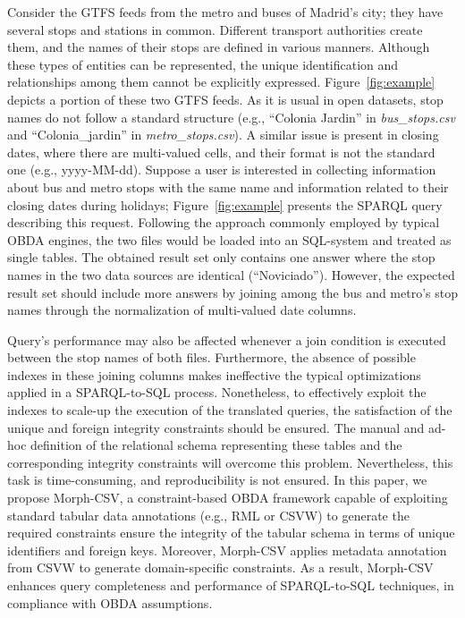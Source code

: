 Consider the GTFS feeds from the metro and buses of Madrid's city; they have several stops and stations in common. Different transport authorities create them, and the names of their stops are defined in various manners. Although these types of entities can be represented, the unique identification and relationships among them cannot be explicitly expressed. Figure~\ref{fig:example} depicts a portion of these two GTFS feeds. As it is usual in open datasets, stop names do not follow a standard structure (e.g., ``Colonia Jardin'' in \textit{bus\_stops.csv} and ``Colonia\_jardin'' in \textit{metro\_stops.csv}). A similar issue is present in closing dates, where there are multi-valued cells, and their format is not the standard one (e.g., yyyy-MM-dd). Suppose a user is interested in collecting information about bus and metro stops with the same name and information related to their closing dates during holidays; Figure~\ref{fig:example} presents the SPARQL query describing this request. Following the approach commonly employed by typical OBDA engines, the two files would be loaded into an SQL-system and treated as single tables. The obtained result set only contains one answer where the stop names in the two data sources are identical (``Noviciado''). However, the expected result set should include more answers by joining among the bus and metro's stop names through the normalization of multi-valued date columns. 

Query's performance may also be affected whenever a join condition is executed between the stop names of both files. Furthermore, the absence of possible indexes in these joining columns makes ineffective the typical optimizations applied in a SPARQL-to-SQL process. Nonetheless, to effectively exploit the indexes to scale-up the execution of the translated queries, the satisfaction of the unique and foreign integrity constraints should be ensured. The manual and ad-hoc definition of the relational schema representing these tables and the corresponding integrity constraints will overcome this problem. Nevertheless, this task is time-consuming, and reproducibility is not ensured. In this paper, we propose Morph-CSV, a constraint-based OBDA framework capable of exploiting standard tabular data annotations (e.g., RML or CSVW) to generate the required constraints ensure the integrity of the tabular schema in terms of unique identifiers and foreign keys. Moreover, Morph-CSV applies metadata annotation from CSVW to generate domain-specific constraints. As a result, Morph-CSV enhances query completeness and performance of SPARQL-to-SQL techniques, in compliance with OBDA assumptions.


